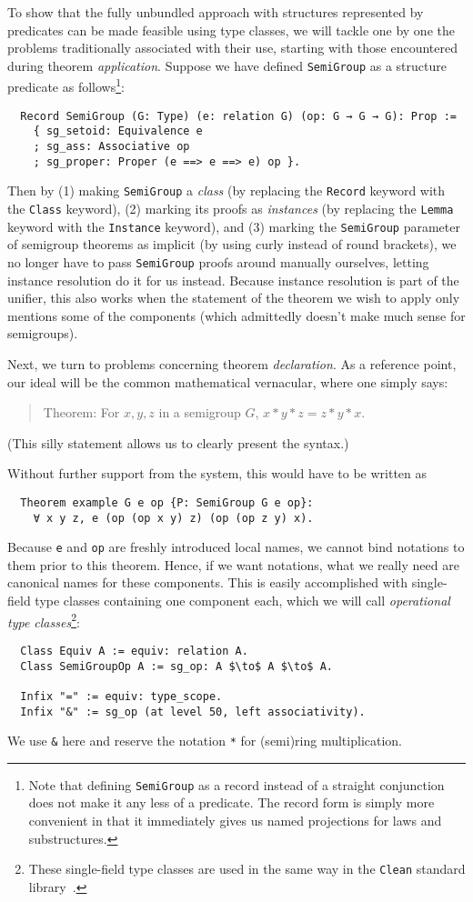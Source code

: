 \documentclass[a4paper,10pt,runningheads]{llncs}
\begin{document}
To show that the fully unbundled approach with structures represented by predicates can be made feasible using type classes, we will tackle one by one the problems traditionally associated with their use, starting with those encountered during theorem \emph{application}. Suppose we have defined \lstinline|SemiGroup| as a structure predicate as follows\footnote{Note that defining \lstinline|SemiGroup| as a record instead of a straight conjunction does not make it any less of a predicate. The record form is simply more convenient in that it immediately gives us named projections for laws and substructures.}:
\begin{lstlisting}
  Record SemiGroup (G: Type) (e: relation G) (op: G → G → G): Prop :=
    { sg_setoid: Equivalence e
    ; sg_ass: Associative op
    ; sg_proper: Proper (e ==> e ==> e) op }.
\end{lstlisting}
Then by (1) making \lstinline|SemiGroup| a \emph{class} (by replacing the \lstinline|Record| keyword with the \lstinline|Class| keyword), (2) marking its proofs as \emph{instances} (by replacing the \lstinline|Lemma| keyword with the \lstinline|Instance| keyword), and (3) marking the \lstinline|SemiGroup| parameter of semigroup theorems as implicit (by using curly instead of round brackets), we no longer have to pass \lstinline|SemiGroup| proofs around manually ourselves, letting instance resolution do it for us instead. Because instance resolution is part of the unifier, this also works when the statement of the theorem we wish to apply only mentions some of the components (which admittedly doesn't make much sense for semigroups).

Next, we turn to problems concerning theorem \emph{declaration}. As a reference point, our ideal will be the common mathematical vernacular, where one simply says:
\begin{quote}
Theorem: For $x, y, z$ in a semigroup $G$, $x * y * z = z * y * x$.
\end{quote}
(This silly statement allows us to clearly present the syntax.)

Without further support from the system, this would have to be written as
\begin{lstlisting}
  Theorem example G e op {P: SemiGroup G e op}:
    ∀ x y z, e (op (op x y) z) (op (op z y) x).
\end{lstlisting}
Because \lstinline|e| and \lstinline{op} are freshly introduced local names, we cannot bind notations to them prior to this theorem. Hence, if we want notations, what we really need are canonical names for these components. This is easily accomplished with single-field type classes containing one component each, which we will call \emph{operational type classes}\footnote{These single-field type classes are used in the same way in the \lstinline|Clean| standard library~\cite{clean}.}:
\begin{lstlisting}
  Class Equiv A := equiv: relation A.
  Class SemiGroupOp A := sg_op: A $\to$ A $\to$ A.

  Infix "=" := equiv: type_scope.
  Infix "&" := sg_op (at level 50, left associativity).
\end{lstlisting}
We use \lstinline|&| here and reserve the notation \lstinline|*| for (semi)ring multiplication.
\end{document}
